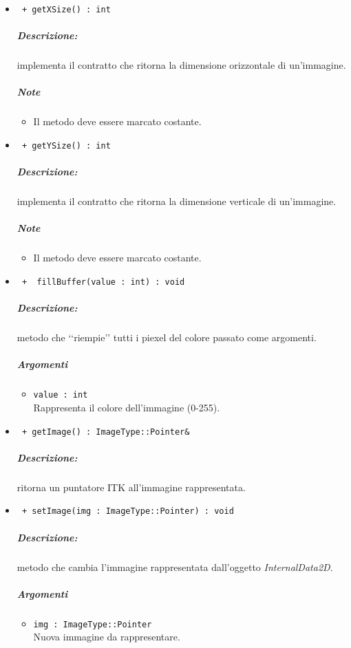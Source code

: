 \begin{itemize}
		\item \color{blue}\verb! + getXSize() : int !\\
		\color{black} 
		\subparagraph{Descrizione:} implementa il contratto che ritorna la dimensione orizzontale di un'immagine.
		\subparagraph{Note}
			\begin{itemize}
				\item Il metodo deve essere marcato costante.
			\end{itemize}
		
		\item \color{blue}\verb! + getYSize() : int !\\
		\color{black}
		\subparagraph{Descrizione:} implementa il contratto che ritorna la dimensione verticale di un'immagine.
		\subparagraph{Note}
			\begin{itemize}
				\item Il metodo deve essere marcato costante.
			\end{itemize}
		
		\item \color{blue}\verb! +  fillBuffer(value : int) : void!\\
		\color{black}
		\subparagraph{Descrizione:} metodo che  \lq\lq{}riempie\rq\rq{} tutti i piexel del colore passato come argomenti.
		\subparagraph{Argomenti}
			\begin{itemize}
				\item \color{blue}\verb!value : int!\\
				\color{black}Rappresenta il colore dell'immagine (0-255). 
			\end{itemize}
		
		\item \color{blue}\verb! + getImage() : ImageType::Pointer& !\\
		\color{black}
		\subparagraph{Descrizione:} ritorna un puntatore ITK\g{} all'immagine rappresentata.
		
		\item \color{blue}\verb! + setImage(img : ImageType::Pointer) : void!\\
		\color{black}
		\subparagraph{Descrizione:} metodo che cambia l'immagine rappresentata dall'oggetto \textsl{InternalData2D}.
		\subparagraph{Argomenti}
			\begin{itemize}
				\item \color{RoyalPurple}\verb!img : ImageType::Pointer!\\
				\color{black}
				Nuova immagine da rappresentare.
			\end{itemize}
			

\end{itemize}
